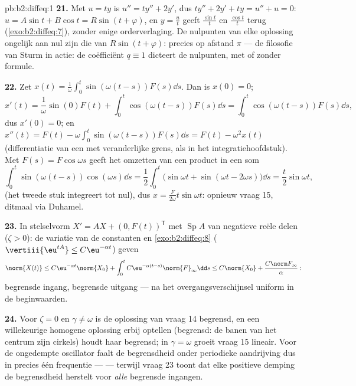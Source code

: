 \begin{solution}{pb:b2:diffeq:1}
\textbf{21.} Met $u = ty$ is $u'' = ty'' + 2y'$, dus $ty'' + 2y' +
ty = u'' + u = 0$: $u = A\sin t + B\cos t = R\sin(t + \varphi)$, en
$y = \frac{u}{t}$ geeft $\frac{\sin t}t$ en $\frac{\cos t}t$
terug (\cref{exo:b2:diffeq:7}), zonder enige orderverlaging. De
nulpunten van elke oplossing ongelijk aan nul zijn die van
$R\sin(t + \varphi)$: precies op afstand $\pi$ --- de filosofie van
Sturm in actie: de coëfficiënt $q \equiv 1$ dicteert de nulpunten,
met of zonder formule.

\textbf{22.} Zet $x(t) =
\frac1\omega\int_0^t\sin(\omega(t-s))F(s)\dd s$. Dan is $x(0) = 0$;
\[
x'(t) = \frac1\omega\sin(0)F(t) +
\int_0^t\cos(\omega(t-s))F(s)\dd s
= \int_0^t\cos(\omega(t-s))F(s)\dd s ,
\]
dus $x'(0) = 0$; en $x''(t) = F(t) -
\omega\int_0^t\sin(\omega(t-s))F(s)\dd s = F(t) - \omega^2x(t)$
(differentiatie van een  met veranderlijke grens,
als in het integratiehoofdstuk). Met $F(s) = F\cos\omega s$ geeft
het omzetten van een product in een som
\[
\int_0^t\sin(\omega(t-s))\cos(\omega s)\dd s
= \frac12\int_0^t\bigl(\sin\omega t + \sin(\omega t -
2\omega s)\bigr)\dd s
= \frac{t}{2}\sin\omega t ,
\]
(het tweede stuk integreert tot nul), dus $x =
\frac{F}{2\omega}t\sin\omega t$: opnieuw vraag 15, ditmaal via
Duhamel.

\textbf{23.} In stelselvorm $X' = AX + (0, F(t))^{\mathsf T}$ met
$\operatorname{Sp}A$ van negatieve reële delen ($\zeta > 0$): de
variatie van de constanten en \cref{exo:b2:diffeq:8}
($\vertiii{\eu^{tA}} \leq C\eu^{-\alpha t}$) geven
\[
\norm{X(t)} \leq C\eu^{-\alpha t}\norm{X_0}
+ \int_0^t C\eu^{-\alpha(t-s)}\norm{F}_\infty\dd s
\leq C\norm{X_0} + \frac{C\norm F_\infty}{\alpha} :
\]
begrensde ingang, begrensde uitgang --- na het
overgangsverschijnsel uniform in de beginwaarden.

\textbf{24.} Voor $\zeta = 0$ en $\gamma \neq \omega$ is de
oplossing van vraag 14 begrensd, en een willekeurige homogene
oplossing erbij optellen (begrensd: de banen van het centrum zijn
cirkels) houdt haar begrensd; in $\gamma = \omega$ groeit vraag 15
lineair. Voor de ongedempte oscillator faalt de begrensdheid onder
periodieke aandrijving dus in precies één frequentie ---
 --- terwijl vraag 23 toont dat elke positieve demping de
begrensdheid herstelt voor \emph{alle} begrensde ingangen.


\end{solution}

